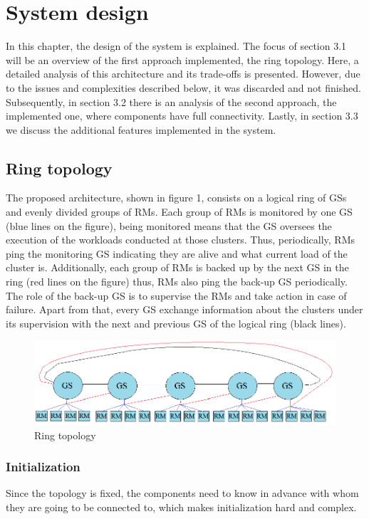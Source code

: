 \section{System design}
In this chapter, the design of the system is explained.
The focus of section 3.1 will be an overview of the first approach implemented, the ring topology. Here, a detailed analysis of this architecture and its trade-offs is presented. However, due to the issues and complexities described below, it was discarded and not finished. Subsequently, in section 3.2 there is an analysis of the second approach, the implemented one, where components have full connectivity. Lastly, in section 3.3 we discuss the additional features implemented in the system.

\subsection{Ring topology}

The proposed architecture, shown in figure 1, consists on a logical ring of GSs and evenly divided groups of RMs.
Each group of RMs is monitored by one GS (blue lines on the figure), being monitored means that the GS oversees the execution of the workloads conducted at those clusters. Thus, periodically, RMs ping the monitoring GS indicating they are alive and what current load of the cluster is. Additionally, each group of RMs is backed up by the next GS in the ring (red lines on the figure) thus, RMs also ping the back-up GS periodically. The role of the back-up GS is to supervise the RMs and take action in case of failure. Apart from that, every GS exchange information about the clusters under its supervision with the next and previous GS of the logical ring (black lines).
\\ 
\begin{figure}[H]
\centering
	\includegraphics[scale=0.61]{ring.png}
	\caption{Ring topology}
\end{figure}

\subsubsection{Initialization}
Since the topology is fixed, the components need to know in advance with whom they are going to be connected to, which makes initialization hard and complex.

